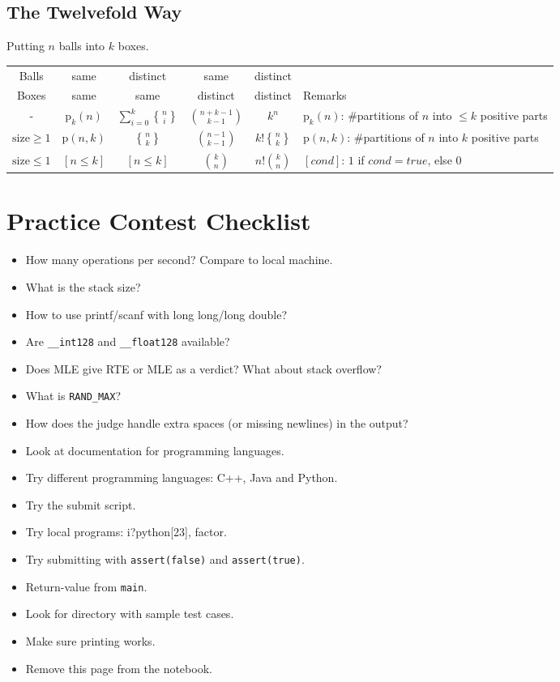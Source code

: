 \documentclass[11.5pt,a4paper,landscape,oneside]{amsart}
\DeclareRobustCommand{\stirling}{\genfrac\{\}{0pt}{}}
\begin{document}
\begin{multicols*}{2}
    \subsection{The Twelvefold Way}
        Putting $n$ balls into $k$ boxes.\\
    \begin{tabular}{@{}c|c|c|c|c|l@{}}
    Balls & same & distinct & same & distinct & \\
    Boxes & same & same & distinct & distinct & Remarks\\
    \hline
        - & $\mathrm{p}_k(n)$ & $\sum_{i=0}^k \stirling{n}{i}$ & $\binom{n+k-1}{k-1}$ & $k^n$ & $\mathrm{p}_k(n)$: \#partitions of $n$ into $\le k$ positive parts \\
        $\mathrm{size}\ge 1$ & $\mathrm{p}(n,k)$ & $\stirling{n}{k}$ & $\binom{n-1}{k-1}$ & $k!\stirling{n}{k}$ & $\mathrm{p}(n,k)$: \#partitions of $n$ into $k$ positive parts \\
        $\mathrm{size}\le 1$ & $[n \le k]$ & $[n \le k]$ & $\binom{k}{n}$ & $n!\binom{k}{n}$ & $[cond]$: $1$ if $cond=true$, else $0$\\
    \bottomrule
    \end{tabular}
\clearpage
    \section*{Practice Contest Checklist}
        \begin{itemize}
            \item How many operations per second? Compare to local machine.
            \item What is the stack size?
            \item How to use printf/scanf with long long/long double?
            \item Are \texttt{\_{}\_{}int128} and \texttt{\_{}\_{}float128} available?
            \item Does MLE give RTE or MLE as a verdict? What about stack overflow?
            \item What is \texttt{RAND\_{}MAX}?
            \item How does the judge handle extra spaces (or missing newlines) in the output?
            \item Look at documentation for programming languages.
            \item Try different programming languages: C++, Java and Python.
            \item Try the submit script.
            \item Try local programs: i?python[23], factor.
            \item Try submitting with \texttt{assert(false)} and \texttt{assert(true)}.
            \item Return-value from \texttt{main}.
            \item Look for directory with sample test cases.
            \item Make sure printing works.

            \item Remove this page from the notebook.
        \end{itemize}

\end{multicols*}
\end{document}
